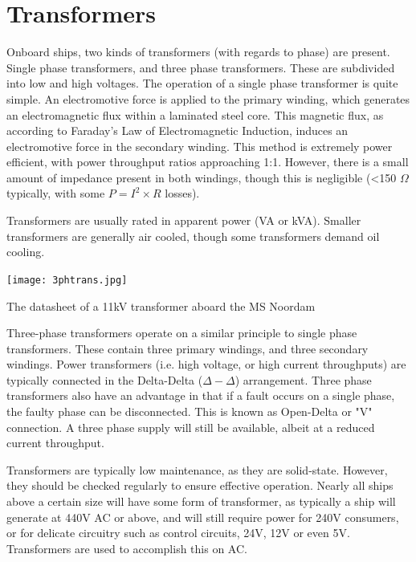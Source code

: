 \documentclass[11pt,a4paper]{article}
\begin{document}
\section{Transformers}
Onboard ships, two kinds of transformers (with regards to phase) are present. Single phase transformers, and three phase transformers. These are subdivided into low and high voltages. The operation of a single phase transformer is quite simple. An electromotive force is applied to the primary winding, which generates an electromagnetic flux within a laminated steel core. This magnetic flux, as according to Faraday's Law of Electromagnetic Induction, induces an electromotive force in the secondary winding. This method is extremely power efficient, with power throughput ratios approaching 1:1. However, there is a small amount of impedance present in both windings, though this is negligible (<150 $\Omega$ typically, with some $P=I^2\times R$ losses).

Transformers are usually rated in apparent power (VA or kVA). Smaller transformers are generally air cooled, though some transformers demand oil cooling.

\begin{center}
\texttt{[image: 3phtrans.jpg]}\par
The datasheet of a 11kV transformer aboard the MS Noordam
\end{center}

Three-phase transformers operate on a similar principle to single phase transformers. These contain three primary windings, and three secondary windings. Power transformers (i.e. high voltage, or high current throughputs) are typically connected in the Delta-Delta ($\Delta - \Delta$) arrangement. Three phase transformers also have an advantage in that if a fault occurs on a single phase, the faulty phase can be disconnected. This is known as Open-Delta or "V" connection. A three phase supply will still be available, albeit at a reduced current throughput.

Transformers are typically low maintenance, as they are solid-state. However, they should be checked regularly to ensure effective operation. Nearly all ships above a certain size will have some form of transformer, as typically a ship will generate at 440V AC or above, and will still require power for 240V consumers, or for delicate circuitry such as control circuits, 24V, 12V or even 5V. Transformers are used to accomplish this on AC.\cite[p. 29]{e11}
\end{document}

